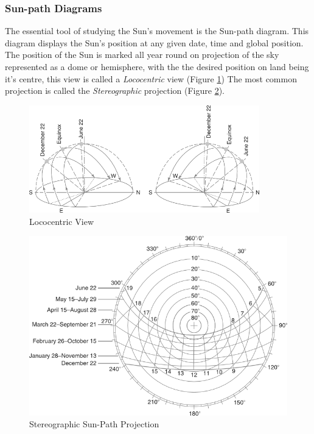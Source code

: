 \subsubsection{Sun-path Diagrams}
The essential tool of studying the Sun's movement is the Sun-path diagram. This diagram displays the Sun's position at any given date, time and global position. The position of the Sun is marked all year round on projection of the sky represented as a dome or hemisphere, with the the desired position on land being it's centre, this view is called a \emph{Lococentric} view (Figure \ref{Lococentric}) The most common projection is called the \emph{Stereographic} projection (Figure \ref{Stereographic}).

\begin{figure}[htbp]
\centering
\includegraphics[width=10cm]{./Images/3-Lococentric}
\caption[Lococentric Sun Path View]{Lococentric View \cite{szokolay08}}
\label{Lococentric}
\end{figure}

\begin{figure}[htbp]
\includegraphics[width=\textwidth]{./Images/4-Stereographic}
\caption[Stereographic Sun-Path Projection] {Stereographic Sun-Path Projection \cite{szokolay08}}
\label{Stereographic}
\end{figure}

